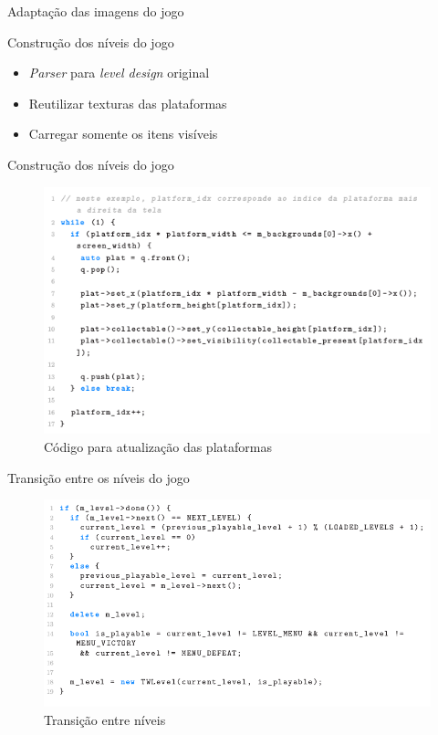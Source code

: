 \documentclass[notes, mathserif]{beamer}
\begin{document}
\begin{frame}{Adapta\c c\~ao das imagens do jogo}
\end{frame}

\begin{frame}{Constru\c c\~ao dos n\'iveis do jogo}
	\begin{itemize}[<+->]
		\item \textit{Parser} para \textit{level design} original
		\item Reutilizar texturas das plataformas
		\item Carregar somente os itens vis\'iveis
	\end{itemize}
\end{frame}

\begin{frame}{Constru\c c\~ao dos n\'iveis do jogo}
	\begin{figure}[H]
		\includegraphics[width=.7\linewidth]{figuras/plats.png}
		\centering
		\caption{C\'odigo para atualiza\c c\~ao das plataformas}
		\label{fig:vsync}
	\end{figure}
\end{frame}

\begin{frame}{Transi\c c\~ao entre os n\'iveis do jogo}
	\begin{figure}[H]
		\includegraphics[width=.8\linewidth]{figuras/transicao.png}
		\centering
		\caption{Transi\c c\~ao entre n\'iveis}
		\label{fig:vsync}
	\end{figure}
\end{frame}
\end{document}
